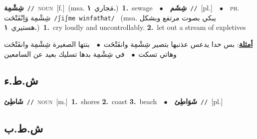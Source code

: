 \documentclass[10pt,a4paper,twoside]{article} %
\begin{document}
\begin{multicols}{2}
{\setlength\topsep{0pt}\textbf{\foreignlanguage{arabic}{شِشْمِة}}\ {\color{gray}\texttt{//}\color{black}}\ \textsc{noun}\ [f.]\ \color{gray}(msa. \foreignlanguage{arabic}{مَجاري}~\foreignlanguage{arabic}{\textbf{١.}})\color{black}\ \textbf{1.}~sewage\ \ $\bullet$\ \ \setlength\topsep{0pt}\textbf{\foreignlanguage{arabic}{شِشَم}}\ {\color{gray}\texttt{//}\color{black}}\ [pl.]\ \ $\bullet$\ \ \textsc{ph.} \color{gray} \foreignlanguage{arabic}{شِشْمِة وَاِنْفَتْحَت}\color{black}\ {\color{gray}\texttt{/{\sffamily ʃiʃme winfatħat}/}\color{black}}\ \color{gray} (msa. \foreignlanguage{arabic}{يبكي بصوت مرتفع وبشكل هستيري}~\foreignlanguage{arabic}{\textbf{١.}})\color{black}\ \textbf{1.}~cry loudly and uncontrollably.  \textbf{2.}~let out a stream of expletives\  \begin{flushright}\color{gray}\foreignlanguage{arabic}{\textbf{\underline{\foreignlanguage{arabic}{أمثلة}}}: بس حدا يدعس عذنبها بتصير شِشْمِة وانفَتْحَت\ $\bullet$\ \  بنتها الصغيرة شِشْمِة وانفَتْحَت وهاتي تسكت\ $\bullet$\ \  في شِشْمِة بدها تسليك بعيد عن السامعين}\end{flushright}\color{black}} \vspace{2mm}

\vspace{-3mm}
\subsection*{\color{blue}\foreignlanguage{arabic}{ش.ط.ء}\color{blue}{}} 

{\setlength\topsep{0pt}\textbf{\foreignlanguage{arabic}{شَاطِئ}}\ {\color{gray}\texttt{//}\color{black}}\ \textsc{noun}\ [m.]\ \textbf{1.}~shores  \textbf{2.}~coast  \textbf{3.}~beach\ \ $\bullet$\ \ \setlength\topsep{0pt}\textbf{\foreignlanguage{arabic}{شَوَاطِئ}}\ {\color{gray}\texttt{//}\color{black}}\ [pl.]\ } \vspace{2mm}

\vspace{-3mm}
\subsection*{\color{blue}\foreignlanguage{arabic}{ش.ط.ب}\color{blue}{}} 


\end{multicols}
\end{document}
